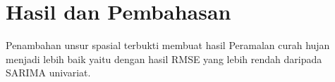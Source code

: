 \chapter{Hasil dan Pembahasan}



Penambahan unsur spasial terbukti membuat hasil Peramalan curah hujan menjadi lebih baik yaitu dengan hasil RMSE yang lebih rendah daripada SARIMA univariat.
